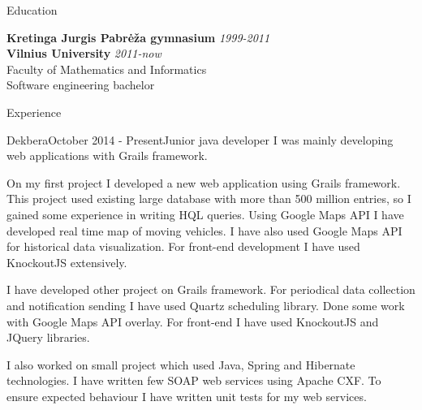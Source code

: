 \documentclass[]{resume} %
\begin{document}

\begin{rSection}{Education}

{\bf Kretinga Jurgis Pabrėža gymnasium} \hfill {\em 1999-2011} \\
{\bf Vilnius University} \hfill {\em 2011-now} \\
Faculty of Mathematics and Informatics\\
Software engineering bachelor\\

\end{rSection}

\begin{rSection}{Experience}

    \begin{rSubsection}{Dekbera}{October 2014 - Present}{Junior java developer}{}
        I was mainly developing web applications with Grails framework.

        On my first project I developed a new web application using Grails framework.
        This project used existing large database with more than 500 million entries, so I gained some experience in writing HQL queries.
        Using Google Maps API I have developed real time map of moving vehicles.
        I have also used Google Maps API for historical data visualization.
        For front-end development I have used KnockoutJS extensively.

        I have developed other project on Grails framework.
        For periodical data collection and notification sending I have used Quartz scheduling library.
        Done some work with Google Maps API overlay.
        For front-end I have used KnockoutJS and JQuery libraries.

        I also worked on small project which used Java, Spring and Hibernate technologies.
        I have written few SOAP web services using Apache CXF.
        To ensure expected behaviour I have written unit tests for my web services.

    \end{rSubsection}

\end{rSection}
\end{document}

